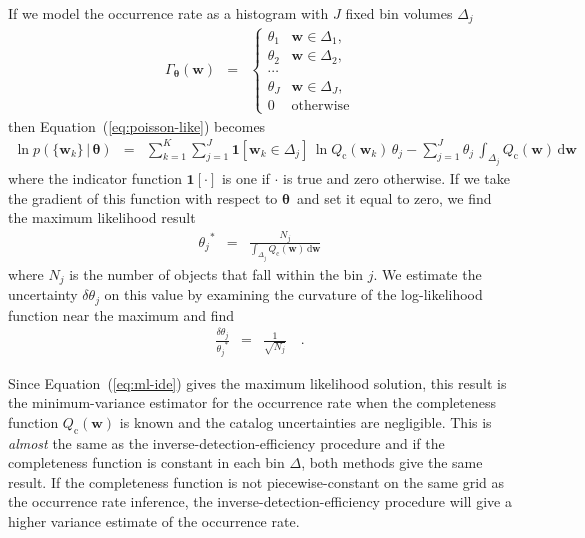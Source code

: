 \documentclass[12pt,preprint]{aastex}
\newcommand{\Eq}[1]{Equation~(\ref{eq:#1})}
\newcommand{\eq}[1]{\Eq{#1}}
\newcommand{\eqlabel}[1]{\label{eq:#1}}
\newcommand{\dd}{\ensuremath{\,\mathrm{d}}}
\newcommand{\bvec}[1]{\ensuremath{\boldsymbol{#1}}}
\newcommand{\rate}{\ensuremath{\Gamma}}
\newcommand{\ratepar}{{\ensuremath{\theta}}}
\newcommand{\ratepars}{{\ensuremath{\bvec{\ratepar}}}}
\newcommand{\completeness}{{\ensuremath{Q_\mathrm{c}}}}
\newcommand{\entry}{{\ensuremath{\bvec{w}}}}
\newcommand{\binarea}{{\ensuremath{\Delta}}}
\begin{document}
If we model the occurrence rate as a histogram with $J$ fixed bin volumes
$\binarea_j$
\begin{eqnarray}
\rate_\ratepars (\entry) &=& \left\{\begin{array}{ll}
\ratepar_1 & \entry \in \binarea_1,\\
\ratepar_2 & \entry \in \binarea_2,\\
\cdots \\
\ratepar_J & \entry \in \binarea_J,\\
0 & \mathrm{otherwise}
\end{array}\right.
\end{eqnarray}
then \eq{poisson-like} becomes
\begin{eqnarray}
\ln p(\{\entry_k\}\,|\,\ratepars) &=&
    \sum_{k=1}^K \sum_{j=1}^J \mathbf{1}[\entry_k \in
        \binarea_j]\,\ln\completeness(\entry_k)\,\ratepar_j
    -\sum_{j=1}^J\ratepar_j\,\int_{\binarea_j} \completeness(\entry)\dd\entry
\end{eqnarray}
where the indicator function $\mathbf{1}[\cdot]$ is one if $\cdot$ is true and
zero otherwise.
If we take the gradient of this function with respect to \ratepars\ and set it
equal to zero, we find the maximum likelihood result
\begin{eqnarray}\eqlabel{ml-ide}
{\ratepar_j}^* &=&
\frac{N_j}{\int_{\binarea_j} \completeness(\entry)\dd\entry}
\end{eqnarray}
where $N_j$ is the number of objects that fall within the bin $j$.
We estimate the uncertainty $\delta\ratepar_j$ on this value by examining the
curvature of the log-likelihood function near the maximum and find
\begin{eqnarray}
\frac{\delta\ratepar_j}{{\ratepar_j}^*} &=& \frac{1}{\sqrt{N_j}} \quad.
\end{eqnarray}

Since \eq{ml-ide} gives the maximum likelihood solution, this result is the
minimum-variance estimator for the occurrence rate when the completeness
function $\completeness(\entry)$ is known and the catalog uncertainties are
negligible.
This is \emph{almost} the same as the inverse-detection-efficiency procedure
and if the completeness function is constant in each bin \binarea, both
methods give the same result.
If the completeness function is not piecewise-constant on the same grid as the
occurrence rate inference, the inverse-detection-efficiency procedure will
give a higher variance estimate of the occurrence rate.
\end{document}
